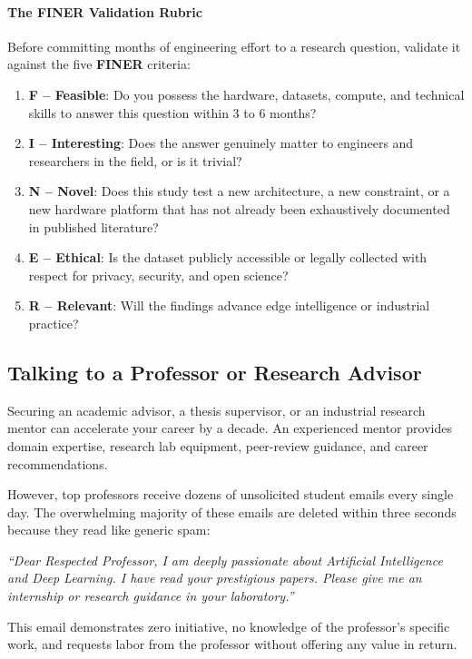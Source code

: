 \paragraph{The FINER Validation Rubric}
Before committing months of engineering effort to a research question, validate it against the five \textbf{FINER} criteria:
\begin{enumerate}
    \item \textbf{F -- Feasible}: Do you possess the hardware, datasets, compute, and technical skills to answer this question within 3 to 6 months?
    \item \textbf{I -- Interesting}: Does the answer genuinely matter to engineers and researchers in the field, or is it trivial?
    \item \textbf{N -- Novel}: Does this study test a new architecture, a new constraint, or a new hardware platform that has not already been exhaustively documented in published literature?
    \item \textbf{E -- Ethical}: Is the dataset publicly accessible or legally collected with respect for privacy, security, and open science?
    \item \textbf{R -- Relevant}: Will the findings advance edge intelligence or industrial practice?
\end{enumerate}

\subsection{Talking to a Professor or Research Advisor}\label{subsec:talking_to_professor}

Securing an academic advisor, a thesis supervisor, or an industrial research mentor can accelerate your career by a decade. An experienced mentor provides domain expertise, research lab equipment, peer-review guidance, and career recommendations.

However, top professors receive dozens of unsolicited student emails every single day. The overwhelming majority of these emails are deleted within three seconds because they read like generic spam:
\begin{center}
\emph{``Dear Respected Professor, I am deeply passionate about Artificial Intelligence and Deep Learning. I have read your prestigious papers. Please give me an internship or research guidance in your laboratory.''}
\end{center}
This email demonstrates zero initiative, no knowledge of the professor's specific work, and requests labor from the professor without offering any value in return.

